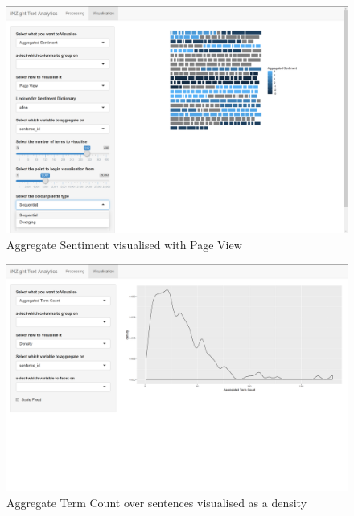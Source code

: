 \documentclass[11pt, a4paper, oneside]{report}
\begin{document}
\begin{figure}
\centering
\includegraphics[scale=0.4]{visualisation-agg-sent-pageview.png}
\caption{Aggregate Sentiment visualised with Page View\label{fig:visualisation-agg-sent-pageview}}
\end{figure}

\begin{figure}
\centering
\includegraphics[scale=0.4]{visualisation-agg-term-count-density.png}
\caption{Aggregate Term Count over sentences visualised as a density\label{fig:visualisation-agg-term-count-density}}
\end{figure}
\end{document}
